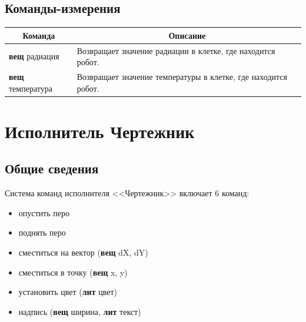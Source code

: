 \subsection{Команды-измерения}
\begin{center}
\begin{tabular}{||p{3.5cm}|p{12.5cm}||}
\hline
\hline
\multicolumn{1}{||c|}{\bfseries Команда} & \multicolumn{1}{|c||}{\bfseries Описание}\\
\hline
	\textbf{вещ} радиация &
	Возвращает значение радиации в клетке, где находится робот.\\
	\textbf{вещ} температура &
	Возвращает значение температуры в клетке, где находится робот. \\
\hline
\hline
\end{tabular}
\end{center}

\section{Исполнитель Чертежник}

\subsection{Общие сведения}

Система команд исполнителя <<Чертежник>> включает 6 команд:
\begin{itemize}
\item	опустить перо
\item	поднять перо
\item	сместиться на вектор (\textbf{вещ} dX, dY)
\item	сместиться в точку (\textbf{вещ} x, y)
\item	установить цвет (\textbf{лит} цвет)
\item   надпись (\textbf{вещ} ширина, \textbf{лит} текст)
\end{itemize}

